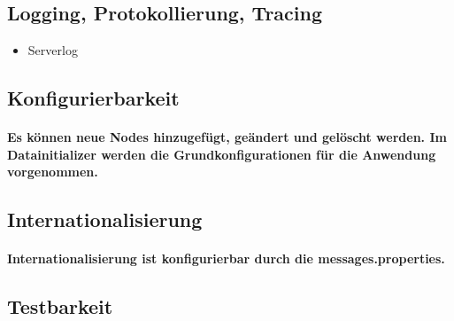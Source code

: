 \documentclass[a4paper]{article}
\begin{document}
\subsection{Logging, Protokollierung, Tracing}

\begin{itemize}
	\item Serverlog
\end{itemize}

\subsection{Konfigurierbarkeit}

\paragraph{Es können neue Nodes hinzugefügt, geändert und gelöscht werden. Im Datainitializer werden die Grundkonfigurationen für die Anwendung vorgenommen.}

\subsection{Internationalisierung}

\paragraph{Internationalisierung ist konfigurierbar durch die messages.properties.}

\subsection{Testbarkeit}
\end{document}
